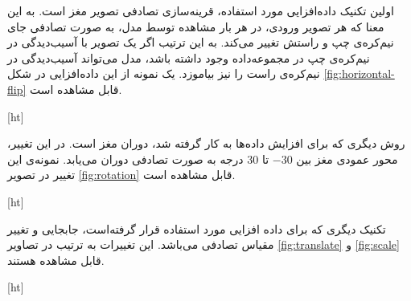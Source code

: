  اولین تکنیک داده‌افزایی مورد استفاده، قرینه‌سازی تصادفی تصویر مغز است.
 به این معنا که هر تصویر ورودی، در هر بار مشاهده توسط مدل، به صورت تصادفی
 جای نیم‌کره‌ی چپ و راستش تغییر می‌کند.
 به این ترتیب اگر یک تصویر با آسیب‌دیدگی در نیم‌کره‌ی چپ در مجموعه‌داده وجود داشته باشد، مدل می‌تواند آسیب‌دیدگی در نیم‌کره‌ی راست را نیز بیاموزد.
 یک نمونه از این داده‌افزایی در شکل \ref{fig:horizontal-flip} قابل مشاهده است.


[ht]

روش دیگری که برای افزایش داده‌ها به کار گرفته شد، دوران مغز است. در این 
تغییر، محور عمودی مغز بین $-30$ تا $30$ درجه به صورت تصادفی دوران می‌یابد.
نمونه‌ی این تغییر در تصویر \ref{fig:rotation}
قابل مشاهده است.


[ht]

تکنیک دیگری که برای داده افزایی مورد استفاده قرار گرفته‌است، جابجایی و تغییر مقیاس تصادفی می‌باشد.
این تغییرات به ترتیب در تصاویر \ref{fig:translate} و \ref{fig:scale} قابل مشاهده هستند.


[ht]


